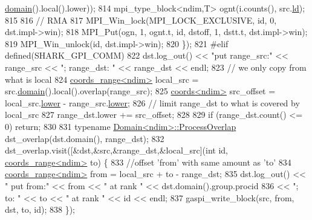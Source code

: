 \begin{DoxyCode}
      \hyperlink{classshark_1_1ndim_1_1_global_array_a435ee8ff23c3feadf2ef2be64d4f375c}{domain}().local().lower));
814             mpi\_type\_block<ndim,T> ognt(i.counts(), src.\hyperlink{classshark_1_1ndim_1_1_global_array_afdc4665e0fde4a703785436af351df49}{ld});
815 
816             \textcolor{comment}{// RMA}
817             MPI\_Win\_lock(MPI\_LOCK\_EXCLUSIVE, \textcolor{keywordtype}{id}, 0, dst.impl->win);
818             MPI\_Put(ogn, 1, ognt.t, \textcolor{keywordtype}{id}, dstoff, 1, dstt.t, dst.impl->win);
819             MPI\_Win\_unlock(\textcolor{keywordtype}{id}, dst.impl->win);
820             \});
821 \textcolor{preprocessor}{#elif defined(SHARK\_GPI\_COMM)}
822     dst.log\_out() << \textcolor{stringliteral}{"put range\_src:"} << range\_src << \textcolor{stringliteral}{"; range\_dst: "} << range\_dst << endl;
823     \textcolor{comment}{// we only copy from what is local}
824     \hyperlink{structshark_1_1ndim_1_1coords__range}{coords\_range<ndim>} local\_src = src.\hyperlink{classshark_1_1ndim_1_1_global_array_a435ee8ff23c3feadf2ef2be64d4f375c}{domain}().local().overlap(range\_src);
825     \hyperlink{structshark_1_1ndim_1_1coords}{coords<ndim>} src\_offset = local\_src.\hyperlink{structshark_1_1ndim_1_1coords__range_a46cae2c424d7b20f911a970c92581b19}{lower} - range\_src.\hyperlink{structshark_1_1ndim_1_1coords__range_a46cae2c424d7b20f911a970c92581b19}{lower};
826     \textcolor{comment}{// limit range\_dst to what is covered by local\_src}
827     range\_dst.lower += src\_offset;
828 
829     \textcolor{keywordflow}{if} (range\_dst.count() <= 0) \textcolor{keywordflow}{return};
830 
831     \textcolor{keyword}{typename} \hyperlink{classshark_1_1ndim_1_1_domain_1_1_process_overlap}{Domain<ndim>::ProcessOverlap} dst\_overlap(dst.domain(), range\_dst);
832     dst\_overlap.visit([&dst,&src,&range\_dst,&local\_src](\textcolor{keywordtype}{int} \textcolor{keywordtype}{id}, 
      \hyperlink{structshark_1_1ndim_1_1coords__range}{coords\_range<ndim>} to) \{
833             \textcolor{comment}{//offset 'from' with same amount as 'to'}
834             \hyperlink{structshark_1_1ndim_1_1coords__range}{coords\_range<ndim>} from = local\_src + to - range\_dst;
835             dst.log\_out() << \textcolor{stringliteral}{"  put from:"} << from << \textcolor{stringliteral}{" at rank "} << dst.domain().group.procid 
836             << \textcolor{stringliteral}{"; to: "} << to << \textcolor{stringliteral}{" at rank "} << \textcolor{keywordtype}{id} << endl;
837             gaspi\_write\_block(src, from, dst, to, \textcolor{keywordtype}{id});
838             \});

\end{DoxyCode}
